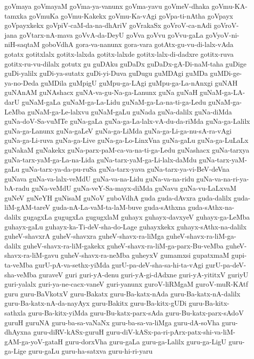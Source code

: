 {goVmaya
goVmayaM
goVma-ya-vanunx
goVma-yavu
goVmeV-dhaka
goVmu-KA-tamxka
goVmuKa
goVmu-Kakekx
goVmu-Ka-vAgi
goVpa-ti-nAtha
goVpayx
goVpayxkekx
goVpiV-caM-da-na-dhAriV
goVrakaSx
goVroV-ca-nAdi
goVroV-jana
goVtarx-nA-mava
goVvA-da-DeyU
goVva
goVvu
goVvu-gaLa
goVyoV-ni-niH-saqtaM
goboVdhA
gora-va-nanunx
gora-vara
gotAtx-gu-vu-di-lalx-vAda
gotatx
gotitxlalx
gotitx-lalxda
gotitx-lalxde
gotitx-lalx-di-dadxre
gotitx-ruva
gotitx-ru-vu-dilalx
gotutx
gu
guDAku
guDaDx
guDaDx-gA-Di-naM-taha
guDige
guDi-yalilx
guDi-ya-sutatx
guDi-yi-Duva
guDugu
guMDAgi
guMDa
guMDi-ge-ya-no-Deda
guMDila
guMpigU
guMpu-ga-LAgi
guMpu-ga-La-nAnxgi
guNAH
guNAnAM
guNAshacx
guNA-va-gu-Na-ga-Lanunx
guNa
guNaH
guNaM-ga-LA-darU
guNaM-gaLa
guNaM-ga-La-Lidu
guNaM-ga-La-na-ti-ga-Ledu
guNaM-ga-LeMba
guNaM-ga-Le-lalxvu
guNaM-gaLu
guNada
guNa-dalilx
guNa-diMda
guNa-doV-Sa-vuMTe
guNa-gaLa
guNa-ga-La-lalx-vA-du-da-riMda
guNa-ga-Lalilx
guNa-ga-Lanunx
guNa-gaLeV
guNa-ga-LiMda
guNa-ga-Li-ga-nu-sA-ra-vAgi
guNa-ga-Li-ruva
guNa-ga-Live
guNa-ga-Lo-LinxVna
guNa-gaLu
guNa-ga-LuLaLx
guNakaM
guNakekx
guNa-parx-paM-ca-va-na-ti-ga-Ledu
guNashacx
guNa-tarxya
guNa-tarx-yaM-ga-La-na-Lida
guNa-tarx-yaM-ga-Li-lalx-daMdu
guNa-tarx-yaM-gaLu
guNa-tarx-ya-da-pu-ruSa
guNa-tarx-yava
guNa-tarx-ya-vi-BeV-deVna
guNava
guNa-va-lalx-veMdU
guNa-va-na-Lidu
guNa-va-na-ridu
guNa-va-na-ri-ya-bA-radu
guNa-veMdU
guNa-veY-Sa-mayx-diMda
guNavu
guNa-vu-LaLxvaM
guNeV
guNeYH
guNisaM
guNoV
guboVdhA
guda
guda-dAvxra
guda-dalilx
guda-liM-gAM-tareV
guda-nA-La-vaM-ta-laM-buve
guda-sAthxna
guda-sAthx-na-dalilx
gugagxLa
gugugxLa
gugugxlaM
guhayx
guhayx-davxyeV
guhayx-ga-LeMba
guhayx-gaLu
guhayx-ka-Ti-deV-sha-do-Lage
guhayxkekx
guhayx-sAthx-na-dalilx
guheV-shavxrA
guheV-shavxra
guheV-shavx-ra-liMga
guheV-shavx-ra-liM-ga-dalilx
guheV-shavx-ra-liM-gakekx
guheV-shavx-ra-liM-ga-parx-Bu-veMba
guheV-shavx-ra-liM-gavu
guheV-shavx-ra-neMba
guheyxV
gumamxsi
gupatxmaM
gupi-ta-veMba
gurU-pA-va-sethx-yiMda
gurU-pa-deV-sha-sa-hi-ta-vAgi
gurU-pa-deV-sha-veMba
guraveV
guri
guri-yA-denu
guri-yA-gi-dAdxne
guri-yA-yititxV
guriyU
guri-yalalx
guri-ya-ne-cacx-vaneV
guri-yanunx
guroV-liRMgaM
guroV-muR-KAtf
guru
guru-BaVkotxV
guru-Bakatx
guru-Ba-katx-nAda
guru-Ba-katx-nA-dalilx
guru-Ba-katx-nA-da-nayAyx
guru-Bakitx
guru-Ba-kitx-gUDi
guru-Ba-kitx-sathxla
guru-Ba-kitx-yiMda
guru-Bu-katx-parx-sAda
guru-Bu-katx-parx-sAdoV
guruH
guruNA
guru-ba-sa-vaNaNx
guru-ba-sa-va-liMga
guru-dA-soVha
guru-dhAyxna
guru-diRV-kASx-guruH
guru-diV-kASx-pa-ri-pArx-patx-shi-va-liM-gAM-ga-yoV-gataH
guru-dorxVha
guru-gaLa
guru-ga-Lalilx
guru-ga-LigU
guru-ga-Lige
guru-gaLu
guru-ha-satxva
guru-hi-ri-yaru
}
